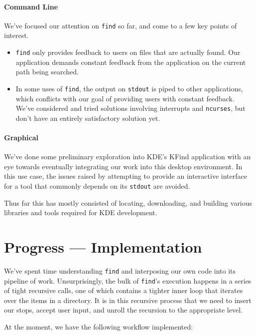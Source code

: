 \documentclass{article}
\begin{document}
\paragraph{Command Line}

We've focused our attention on {\tt find} so far, and come to a few
key points of interest.

\begin{itemize}
\item {\tt find} only provides feedback to users on files that are
  actually found.  Our application demands constant feedback from the
  application on the current path being searched.
\item In some uses of {\tt find}, the output on {\tt stdout} is piped
  to other applications, which conflicts with our goal of providing
  users with constant feedback.  We've considered and tried solutions
  involving interrupts and {\tt ncurses}, but don't have an entirely
  satisfactory solution yet.
\end{itemize}

\paragraph{Graphical}

We've done some preliminary exploration into KDE's KFind application
with an eye towards eventually integrating our work into this desktop
environment. In this use case, the issues raised by attempting to provide an interactive interface for a tool that commonly depends on its {\tt stdout} are avoided.

Thus far this has mostly consisted of locating, downloading, and
building various libraries and tools required for KDE development.

\section{Progress --- Implementation}

We've spent time understanding {\tt find} and interposing our own code
into its pipeline of work.  Unsurprisingly, the bulk of {\tt find}'s
execution happens in a series of tight recursive calls, one of which
contains a tighter inner loop that iterates over the items in a
directory.  It is in this recursive process that we need to insert our
stops, accept user input, and unroll the recursion to the appropriate
level.

At the moment, we have the following workflow implemented:
\end{document}
